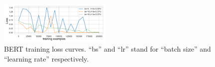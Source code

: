 \begin{figure}[!t]
\centering
\includegraphics[width=0.48\textwidth]{figures/bert_curve.pdf}
\vspace{-22pt}
\caption{\textcolor{check}{BERT training loss curves. ``bs'' and ``lr'' stand for ``batch size'' and  ``learning rate'' respectively.}}
\vspace{-3pt}
\label{fig:bert_motivation}
\end{figure}

